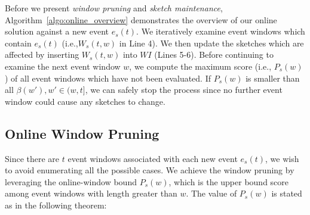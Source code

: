 Before we present \emph{window pruning} and \emph{sketch maintenance}, 
Algorithm~\ref{algo:online_overview} 
demonstrates the overview of our online solution against a new event $e_s(t)$. 
We iteratively examine 
event windows which contain $e_s(t)$ (i.e.,$W_s(t,w)$ in Line 4). 
We then update the sketches which are affected by inserting $W_s(t,w)$ into $WI$ (Lines 5-6). Before continuing to examine the next event window $w$,
we compute the maximum score (i.e., $P_s(w)$) of all event windows which have not been evaluated. If $P_s(w)$ is smaller than all $\beta(w'), w' \in (w,t]$, we can safely stop the process since no further event window could cause any sketches to change.

\subsection{Online Window Pruning}
Since there are $t$ event windows associated with each new event $e_s(t)$, 
we wish to avoid enumerating all the possible cases. 
We achieve the window pruning by leveraging the online-window bound $P_s(w)$, which
is the upper bound score among event windows with length greater than $w$. 
The value of $P_s(w)$ is stated as in the following theorem:

